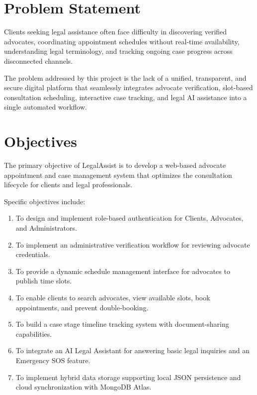 \documentclass[12pt,a4paper]{report}
\begin{document}
\section{Problem Statement}
Clients seeking legal assistance often face difficulty in discovering verified advocates, coordinating appointment schedules without real-time availability, understanding legal terminology, and tracking ongoing case progress across disconnected channels. 

The problem addressed by this project is the lack of a unified, transparent, and secure digital platform that seamlessly integrates advocate verification, slot-based consultation scheduling, interactive case tracking, and legal AI assistance into a single automated workflow.

\section{Objectives}
The primary objective of LegalAssist is to develop a web-based advocate appointment and case management system that optimizes the consultation lifecycle for clients and legal professionals.

Specific objectives include:
\begin{enumerate}
    \item To design and implement role-based authentication for Clients, Advocates, and Administrators.
    \item To implement an administrative verification workflow for reviewing advocate credentials.
    \item To provide a dynamic schedule management interface for advocates to publish time slots.
    \item To enable clients to search advocates, view available slots, book appointments, and prevent double-booking.
    \item To build a case stage timeline tracking system with document-sharing capabilities.
    \item To integrate an AI Legal Assistant for answering basic legal inquiries and an Emergency SOS feature.
    \item To implement hybrid data storage supporting local JSON persistence and cloud synchronization with MongoDB Atlas.
\end{enumerate}
\end{document}

